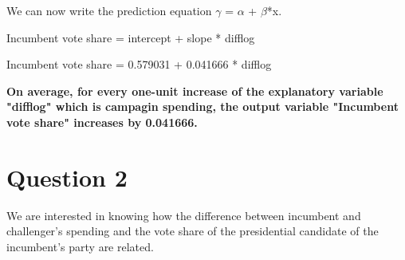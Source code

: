 \documentclass[12pt,letterpaper]{article}
\begin{document}
\begin{enumerate}
		
We can now write the prediction equation $\gamma$ = $\alpha$ + $\beta$*x.
		
		 Incumbent vote share = intercept + slope * difflog
		 
		 Incumbent vote share = 0.579031 + 0.041666 * difflog
		 
	
		\textbf{On average, for every one-unit increase of the explanatory variable "difflog" which is campagin spending, the output variable "Incumbent vote share" increases by 0.041666. }
		
	\end{enumerate}

\section*{Question 2}
\noindent We are interested in knowing how the difference between incumbent and challenger's spending and the vote share of the presidential candidate of the incumbent's party are related.	\vspace{.25cm}
\end{document}
